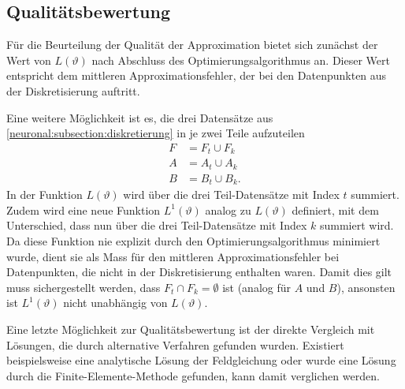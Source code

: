 \subsection{Qualitätsbewertung}\label{neuronal:subsection:qualitätsbewertung}
Für die Beurteilung der Qualität der Approximation bietet sich zunächst der Wert von \( L(\vartheta) \) nach Abschluss des Optimierungsalgorithmus an.
Dieser Wert entspricht dem mittleren Approximationsfehler, der bei den Datenpunkten aus der Diskretisierung auftritt.

Eine weitere Möglichkeit ist es, die drei Datensätze aus \ref{neuronal:subsection:diskretierung} in je zwei Teile aufzuteilen
\begin{equation*}
    \begin{aligned}
        F &= F_t \cup F_k\\
        A &= A_t \cup A_k\\
        B &= B_t \cup B_k.
    \end{aligned}
\end{equation*}
In der Funktion $L(\vartheta)$ wird über die drei Teil-Datensätze mit Index $t$ summiert.
Zudem wird eine neue Funktion \( L^1(\vartheta) \) analog zu $L(\vartheta)$ definiert, mit dem Unterschied, dass nun über die drei Teil-Datensätze mit Index $k$ summiert wird.
Da diese Funktion nie explizit durch den Optimierungsalgorithmus minimiert wurde, dient sie als Mass für den mittleren Approximationsfehler bei Datenpunkten, die nicht in der Diskretisierung enthalten waren.
Damit dies gilt muss sichergestellt werden, dass $F_t \cap F_k = \emptyset$ ist (analog für $A$ und $B$), ansonsten ist $L^1(\vartheta)$ nicht unabhängig von $L(\vartheta)$.

Eine letzte Möglichkeit zur Qualitätsbewertung ist der direkte Vergleich mit Lösungen, die durch alternative Verfahren gefunden wurden.
Existiert beispielsweise eine analytische Lösung der Feldgleichung oder wurde eine Lösung durch die Finite-Elemente-Methode gefunden, kann damit verglichen werden.
